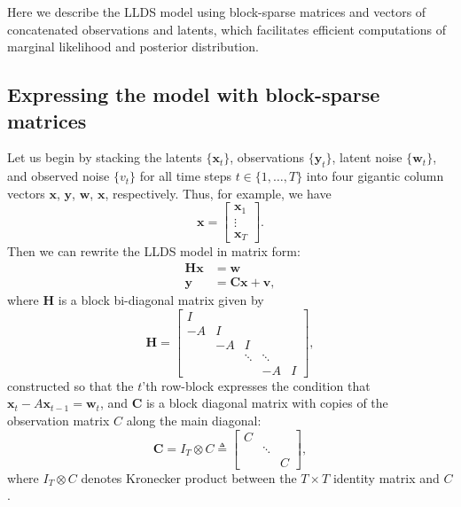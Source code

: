 \documentclass[10pt]{article}
\newcommand{\vx}{\mathbf{x}}
\newcommand{\vw}{\mathbf{w}}
\newcommand{\vy}{\mathbf{y}}
\newcommand{\vv}{\mathbf{v}}
\newcommand{\mH}{\mathbf{H}}
\newcommand{\mC}{\mathbf{C}}
\begin{document}
\begin{appendices}
Here we describe the LLDS model using block-sparse matrices and
vectors of concatenated observations and latents, which facilitates
efficient computations of marginal likelihood and posterior
distribution.

\subsection{Expressing the model with block-sparse matrices}

Let us begin by stacking the latents $\{\vx_t\}$, observations
$\{\vy_t\}$, latent noise $\{\vw_t\}$, and observed noise $\{v_t\}$
for all time steps $t \in \{1, \ldots, T\}$ into four gigantic column
vectors $\vx$, $\vy$, $\vw$, $\vx$, respectively.  Thus, for example,
we have
\begin{equation}
  \label{eq:18}
  \vx = \begin{bmatrix}
    \vx_1 \\ \vdots \\ \vx_T 
  \end{bmatrix}.
\end{equation}
Then we can rewrite the LLDS model in matrix form:
\begin{align}
  \label{eq:Dx}
  \mH \vx &=  \vw  \\
  \label{eq:y}
\vy &= \mC \vx + \vv, 
\end{align}
where $\mH$ is a block bi-diagonal matrix given by
\begin{equation}
\mH = \begin{bmatrix}
  I \\
-A & I \\
  & -A  & I \\
 & & \ddots & \ddots \\ 
 & &  & -A  & I
\end{bmatrix},
\end{equation}
constructed so that the $t$'th row-block expresses the condition that
$\vx_t - A\vx_{t-1} = \vw_t$, and $\mC$ is a block diagonal matrix
with copies of the observation matrix $C$ along the main diagonal:
\begin{equation}
\mC =   I_{T} \otimes C   \triangleq \begin{bmatrix}
C \\
& \ddots \\
& & C 
\end{bmatrix},
\end{equation}
where $ I_T \otimes C$ denotes Kronecker
product between the $T \times T$ identity matrix and $C$.


\end{appendices}
\end{document}
